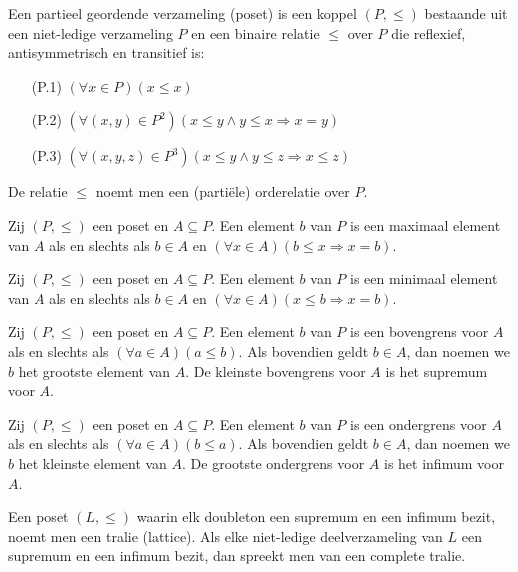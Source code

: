 \begin{definitie}
Een partieel geordende verzameling (poset) is een koppel $(P,\le)$ bestaande uit een niet-ledige
verzameling $P$ en een binaire relatie $\le$ over $P$ die reflexief, antisymmetrisch en 
transitief is:
\begin{itemize}
  \item[(P.1)] $(\forall x \in P)(x \le x)$
  \item[(P.2)] $(\forall (x,y) \in P^2)(x \le y \land y \le x \Rightarrow x = y)$
  \item[(P.3)] $(\forall (x,y,z) \in P^3)(x \le y \land y \le z \Rightarrow x \le z)$
\end{itemize}
De relatie $\le$ noemt men een (parti\"ele) orderelatie over $P$.
\end{definitie} 
\begin{definitie}
Zij $(P,\le)$ een poset en $A \subseteq P$. Een element $b$ van $P$ is een maximaal element
van $A$ als en slechts als $b \in A$ en $(\forall x \in A)(b \le x \Rightarrow x = b)$. 
\end{definitie}
\begin{definitie}
Zij $(P,\le)$ een poset en $A \subseteq P$. Een element $b$ van $P$ is een minimaal element
van $A$ als en slechts als $b \in A$ en $(\forall x \in A)(x \le b \Rightarrow x = b)$. 
\end{definitie}
\begin{definitie}
Zij $(P,\le)$ een poset en $A \subseteq P$. Een element $b$ van $P$ is een bovengrens voor $A$
als en slechts als $(\forall a \in A)(a \le b)$. Als bovendien geldt $b \in A$, dan noemen
we $b$ het grootste element van $A$. De kleinste bovengrens voor $A$ is het
supremum voor $A$.
\end{definitie}
\begin{definitie}
Zij $(P,\le)$ een poset en $A \subseteq P$. Een element $b$ van $P$ is een ondergrens voor $A$
als en slechts als $(\forall a \in A)(b \le a)$. Als bovendien geldt $b \in A$, dan noemen
we $b$ het kleinste element van $A$. De grootste ondergrens voor $A$ is het
infimum voor $A$.
\end{definitie}
\begin{definitie}
Een poset $(L,\le)$ waarin elk doubleton een supremum en een infimum bezit, noemt men een tralie 
(lattice). Als elke niet-ledige deelverzameling van $L$
een supremum en een infimum bezit, dan spreekt men van een complete tralie.
\end{definitie}
